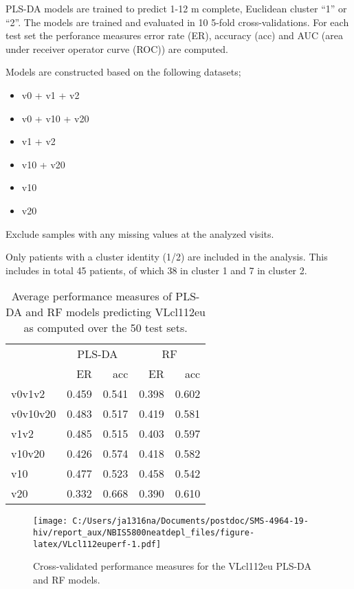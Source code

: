 \documentclass[
]{article}
\providecommand{\tightlist}{%
  \setlength{\itemsep}{0pt}\setlength{\parskip}{0pt}}
\begin{document}
PLS-DA models are trained to predict 1-12 m complete, Euclidean cluster ``1'' or ``2''. The models are trained and evaluated in 10 5-fold cross-validations. For each test set the perforance measures error rate (ER), accuracy (acc) and AUC (area under receiver operator curve (ROC)) are computed.

Models are constructed based on the following datasets;

\begin{itemize}
\tightlist
\item
  v0 + v1 + v2
\item
  v0 + v10 + v20
\item
  v1 + v2
\item
  v10 + v20
\item
  v10
\item
  v20
\end{itemize}

Exclude samples with any missing values at the analyzed visits.

Only patients with a cluster identity (1/2) are included in the analysis. This includes in total 45 patients, of which 38 in cluster 1 and 7 in cluster 2.

\FloatBarrier

\begin{table}

\caption{\label{tab:VLcl112euperf}Average performance measures of PLS-DA and RF models predicting VLcl112eu as computed over the 50 test sets.}
\centering
\begin{tabular}[t]{l|r|r|r|r}
\hline
\multicolumn{1}{c|}{ } & \multicolumn{2}{c|}{PLS-DA} & \multicolumn{2}{c}{RF} \\
\cline{2-3} \cline{4-5}
  & ER & acc & ER & acc\\
\hline
v0v1v2 & 0.459 & 0.541 & 0.398 & 0.602\\
\hline
v0v10v20 & 0.483 & 0.517 & 0.419 & 0.581\\
\hline
v1v2 & 0.485 & 0.515 & 0.403 & 0.597\\
\hline
v10v20 & 0.426 & 0.574 & 0.418 & 0.582\\
\hline
v10 & 0.477 & 0.523 & 0.458 & 0.542\\
\hline
v20 & 0.332 & 0.668 & 0.390 & 0.610\\
\hline
\end{tabular}
\end{table}

\begin{figure}
\centering
\texttt{[image: C:/Users/ja1316na/Documents/postdoc/SMS-4964-19-hiv/report\_aux/NBIS5800neatdepl\_files/figure-latex/VLcl112euperf-1.pdf]}
\caption{\label{fig:VLcl112euperf}Cross-validated performance measures for the VLcl112eu PLS-DA and RF models.}
\end{figure}
\end{document}
